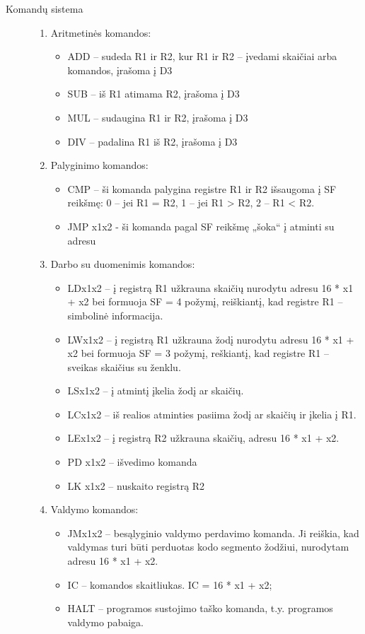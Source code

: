 \begin{description}
\item[Komandų sistema] \leavevmode 
\begin{enumerate}
\item Aritmetinės komandos: \leavevmode 
\begin{itemize}
\item ADD – sudeda R1 ir R2, kur R1 ir R2 – įvedami skaičiai arba komandos, įrašoma į D3
\item SUB – iš R1 atimama R2, įrašoma į D3
\item MUL – sudaugina R1 ir R2, įrašoma į D3
\item DIV – padalina R1 iš R2, įrašoma į D3
\end{itemize}
\item Palyginimo komandos:
\begin{itemize}
\item CMP – ši komanda palygina registre R1 ir R2 išsaugoma į SF reikšmę: 0 – jei R1 = R2,  1 – jei R1 > R2, 2 –  R1 < R2.
\item JMP x1x2 - ši komanda pagal SF reikšmę „šoka“ į atminti su adresu 
\end{itemize}
\item  Darbo su duomenimis komandos:
\begin{itemize}
\item LDx1x2 – į registrą R1 užkrauna skaičių nurodytu adresu 16 * x1 + x2 bei formuoja SF = 4 požymį, reiškiantį, kad registre R1 – simbolinė informacija.
\item LWx1x2 – į registrą R1 užkrauna žodį nurodytu adresu 16 * x1 + x2 bei formuoja SF = 3 požymį, reškiantį, kad registre R1 – sveikas skaičius su ženklu.
\item LSx1x2 – į atmintį įkelia žodį ar skaičių.
\item LCx1x2 – iš realios atminties pasiima žodį ar skaičių ir įkelia į R1.
\item LEx1x2 – į registrą R2 užkrauna skaičių, adresu 16 * x1 + x2.
\item PD x1x2 – išvedimo komanda
\item LK x1x2 – nuskaito registrą R2
\end{itemize}
\item Valdymo komandos:
\begin{itemize}
\item JMx1x2 – besąlyginio valdymo perdavimo komanda. Ji reiškia, kad valdymas turi būti perduotas kodo segmento žodžiui, nurodytam adresu 16 * x1 + x2.
\item IC – komandos skaitliukas. IC = 16 * x1 + x2;
\item HALT – programos sustojimo taško komanda, t.y. programos valdymo pabaiga.
\end{itemize}
\end{enumerate}
\end{description}   
   
